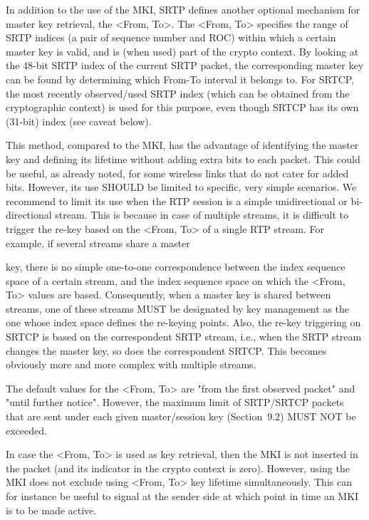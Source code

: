 \documentclass{article}
\begin{document}
In addition to the use of the MKI, SRTP defines another optional mechanism for master key retrieval, the <From, To>.  The <From, To> specifies the range of SRTP indices (a pair of sequence number and ROC) within which a certain master key is valid, and is (when used) part of the crypto context.  By looking at the 48-bit SRTP index of the current SRTP packet, the corresponding master key can be found by determining which From-To interval it belongs to.  For SRTCP, the most recently observed/used SRTP index (which can be obtained from the cryptographic context) is used for this purpose, even though SRTCP has its own (31-bit) index (see caveat below).

This method, compared to the MKI, has the advantage of identifying the master key and defining its lifetime without adding extra bits to each packet.  This could be useful, as already noted, for some wireless links that do not cater for added bits.  However, its use SHOULD be limited to specific, very simple scenarios.  We recommend to limit its use when the RTP session is a simple unidirectional or bi-directional stream.  This is because in case of multiple streams, it is difficult to trigger the re-key based on the <From, To> of a single RTP stream. For example, if several streams share a master

key, there is no simple one-to-one correspondence between the index sequence space of a certain stream, and the index sequence space on which the <From, To> values are based.  Consequently, when a master key is shared between streams, one of these streams MUST be designated by key management as the one whose index space defines the re-keying points.  Also, the re-key triggering on SRTCP is based on the correspondent SRTP stream, i.e., when the SRTP stream changes the master key, so does the correspondent SRTCP.  This becomes obviously more and more complex with multiple streams.

The default values for the <From, To> are "from the first observed packet" and "until further notice".  However, the maximum limit of SRTP/SRTCP packets that are sent under each given master/session key (Section~9.2) MUST NOT be exceeded.

In case the <From, To> is used as key retrieval, then the MKI is not inserted in the packet (and its indicator in the crypto context is zero).  However, using the MKI does not exclude using <From, To> key lifetime simultaneously.  This can for instance be useful to signal at the sender side at which point in time an MKI is to be made active.
\end{document}

